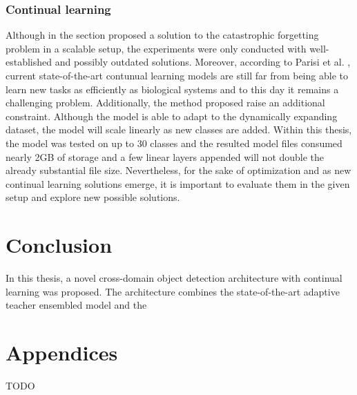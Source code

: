 \documentclass[english, 12pt, a4paper, elec, utf8, a-1b, online]{aaltothesis}
\begin{document}
\subsubsection{Continual learning}
Although in the  section proposed a solution to the catastrophic forgetting problem in a scalable setup, the experiments were only conducted with well-established and possibly outdated solutions. Moreover, according to Parisi et al. \cite{Parisi2018}, current state-of-the-art contunual learning models are still far from being able to learn new tasks as efficiently as biological systems and to this day it remains a challenging problem. Additionally, the method proposed raise an additional constraint. Although the model is able to adapt to the dynamically expanding dataset, the model will scale linearly as new classes are added. Within this thesis, the model was tested on up to 30 classes and the resulted model files consumed nearly 2GB of storage and a few linear layers appended will not double the already substantial file size. Nevertheless, for the sake of optimization and as new continual learning solutions emerge, it is important to evaluate them in the given setup and explore new possible solutions. 

 

\clearpage



\section{Conclusion} 
In this thesis, a novel cross-domain object detection architecture with continual learning was proposed. The architecture combines the state-of-the-art adaptive  teacher ensembled model and the  



\clearpage







\clearpage

\thesisappendix

\section{Appendices}
TODO
\end{document}
